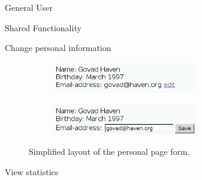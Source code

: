 \begin{section}{General User}
\begin{subsection}{Shared Functionality}
\begin{subsubsection}{Change personal information}
            \begin{figure}
                \centering
                \begin{subfigure}{0.3\textwidth}
                    \includegraphics[width=0.7\textwidth]{img/personal_u.png}
                    \label{img:personal}
                \end{subfigure}

                \begin{subfigure}{0.3\textwidth}
                    \includegraphics[width=0.7\textwidth]{img/personal_e.png}
                    \label{img:personal_edit}
                \end{subfigure}
                \caption{Simplified layout of the personal page form.}
            \end{figure}
        \end{subsubsection}

        \begin{subsubsection}{View statistics}
        \end{subsubsection}

    \end{subsection}

\end{section}


